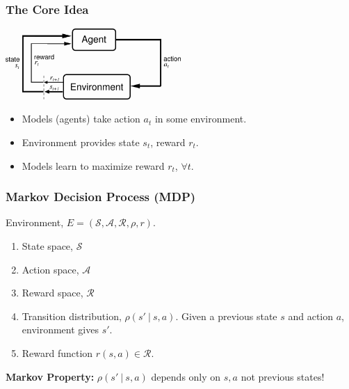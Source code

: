 \begin{frame}
\frametitle{The Core Idea}
\begin{center}
  \includegraphics[width=0.5\textwidth]{reinforcementlearning.png}
\end{center}
\begin{itemize}
  \item Models (agents) take action $a_t$ in some environment.
  \item Environment provides state $s_t$, reward $r_t$.
  \item Models learn to maximize reward $r_t$, $\forall t$.
\end{itemize}
\end{frame}




\begin{frame}
  \frametitle{Markov Decision Process (MDP)}
      Environment, $E = (\mathcal{S}, \mathcal{A}, \mathcal{R}, \rho, r)$. 
        \begin{enumerate}
        \item State space, $\mathcal{S}$
        \item Action space, $\mathcal{A}$
        \item Reward space, $\mathcal{R}$   
        \item Transition distribution, $\rho(s'\ |\ s,a)$. Given a previous state $s$ and action $a$, environment gives $s'$.
        \item Reward function $r(s,a) \in \mathcal{R}$.
        \end{enumerate}
        \textbf{Markov Property:} $\rho(s'\ |\ s,a)$ depends only on $s,a$ not previous states!
\end{frame} 


